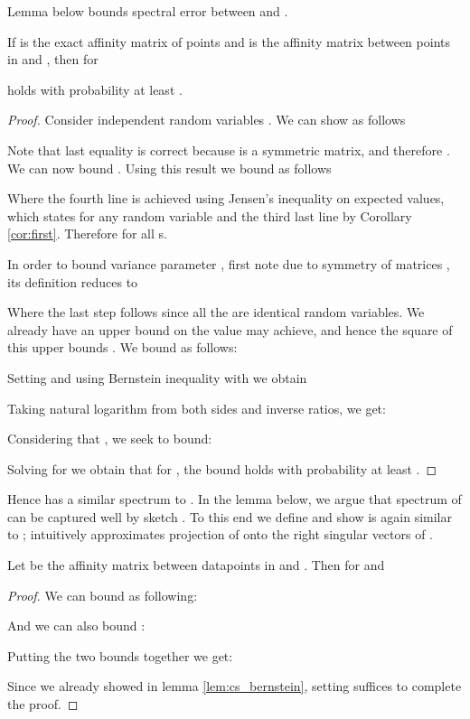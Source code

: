 \documentclass{sig-alternate}
\begin{document}
Lemma below bounds spectral error between  and .
\begin{lemma}
\label{lem:cs_bernstein}
If  is the exact affinity matrix of points  and  is the affinity matrix between points in  and , then for 


holds with probability at least .
\end{lemma}
\begin{proof}
Consider  independent random variables . We can show  as follows

Note that last equality is correct because  is a symmetric matrix, and therefore .
We can now bound . Using this result we bound  as follows

Where the fourth line is achieved using Jensen's inequality on expected values, which states  for any random variable  and the third last line by Corollary \ref{cor:first}. 
Therefore  for all s.

In order to bound variance parameter , first note due to symmetry of matrices , its definition reduces to 

Where the last step follows since all the  are identical random variables. We already have an upper bound on the value  may achieve, and hence the square of this upper bounds . We bound  as follows:



Setting  and using Bernstein inequality with  we obtain 

Taking natural logarithm from both sides and inverse ratios, we get:

Considering that , we seek to bound:

Solving for  we obtain that for , the bound holds with probability at least .\end{proof}

Hence  has a similar spectrum to . In the lemma below, we argue that spectrum of  can be captured well by sketch . To this end we define  and show  is again similar to  
; intuitively  approximates projection of  onto the right singular vectors of .
\begin{lemma}
\label{lem:FD}
Let  be the affinity matrix between datapoints in  and . Then for  and 

\end{lemma}
\begin{proof}
We can bound  as following:

And we can also bound :

Putting the two bounds together we get:

Since we already showed  in lemma \ref{lem:cs_bernstein}, setting  suffices to complete the proof.
\end{proof}
\end{document}
